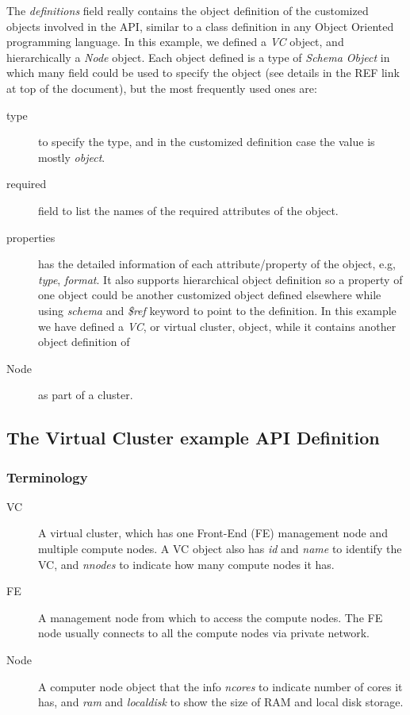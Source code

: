The \emph{definitions} field really contains the object definition of
the customized objects involved in the API, similar to a class
definition in any Object Oriented programming language. In this
example, we defined a \emph{VC} object, and hierarchically a
\emph{Node} object. Each object defined is a type of \emph{Schema
  Object} in which many field could be used to specify the object (see
details in the REF link at top of the document), but the most
frequently used ones are:

\begin{description}
\item[type] to specify the type, and in the customized definition case
  the value is mostly \emph{object}.
\item[required] field to list the names of the required attributes of
  the object.
\item[properties] has the detailed information of each
  attribute/property of the object, e.g, \emph{type},
  \emph{format}. It also supports hierarchical object definition so a
  property of one object could be another customized object defined
  elsewhere while using \emph{schema} and \emph{\$ref} keyword to
  point to the definition. In this example we have defined a
  \emph{VC}, or virtual cluster, object, while it contains another
  object definition of
\item[Node] as part of a cluster.
\end{description}

\subsection{The Virtual Cluster example API Definition}
\label{S:vcluster-spec}

\subsubsection{Terminology}

\begin{description}
\item[VC] A virtual cluster, which has one Front-End (FE) management node and multiple compute nodes. A VC object also has \emph{id} and \emph{name} to identify the VC, and \emph{nnodes} to indicate how many compute nodes it has.
\item[FE] A management node from which to access the compute nodes. The FE node usually connects to all the compute nodes via private network.
\item[Node] A computer node object that the info \emph{ncores} to indicate number of cores it has, and \emph{ram} and \emph{localdisk} to show the size of RAM and local disk storage.
\end{description}

